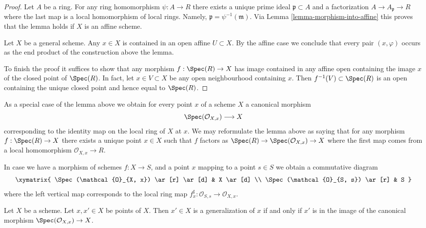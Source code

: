 \begin{proof}
Let $A$ be a ring. For any ring homomorphism $\psi : A \to R$
there exists a unique prime ideal $\mathfrak p \subset A$
and a factorization $A \to A_{\mathfrak p} \to R$ where the
last map is a local homomorphism of local rings. Namely,
$\mathfrak p = \psi^{-1}(\mathfrak m)$. Via
Lemma \ref{lemma-morphism-into-affine}
this proves that the lemma holds if $X$ is an affine scheme.

\medskip\noindent
Let $X$ be a general scheme. Any $x \in X$ is contained in
an open affine $U \subset X$. By the affine case we conclude that every pair
$(x, \varphi)$ occurs as the end product of the construction
above the lemma.

\medskip\noindent
To finish the proof it suffices to show that any morphism
$f : \Spec(R) \to X$ has image contained in any affine
open containing the image $x$ of the closed
point of $\Spec(R)$. In fact, let $x \in V \subset X$
be any open neighbourhood containing $x$. Then
$f^{-1}(V) \subset \Spec(R)$ is an open containing
the unique closed point and hence equal to $\Spec(R)$.
\end{proof}

\noindent
As a special case of the lemma above we obtain for every
point $x$ of a scheme $X$ a canonical morphism
\begin{equation}
\label{equation-canonical-morphism}
\Spec(\mathcal{O}_{X, x}) \longrightarrow X
\end{equation}
corresponding to the identity map on the local ring of $X$ at $x$.
We may reformulate the lemma above as saying that for any
morphism $f : \Spec(R) \to X$ there exists a unique point
$x \in X$ such that $f$ factors as
$\Spec(R) \to \Spec(\mathcal{O}_{X, x}) \to X$
where the first map comes from a local homomorphism
$\mathcal{O}_{X, x} \to R$.

\medskip\noindent
In case we have a morphism of schemes $f : X \to S$,
and a point $x$ mapping to a point $s \in S$ we obtain
a commutative diagram
$$
\xymatrix{
\Spec(\mathcal{O}_{X, x}) \ar[r] \ar[d] & X \ar[d] \\
\Spec(\mathcal{O}_{S, s}) \ar[r] & S
}
$$
where the left vertical map corresponds to the local ring map
$f^\sharp_x : \mathcal{O}_{S, s} \to \mathcal{O}_{X, x}$.

\begin{lemma}
\label{lemma-specialize-points}
Let $X$ be a scheme.
Let $x, x' \in X$ be points of $X$.
Then $x' \in X$ is a generalization of $x$ if and only if
$x'$ is in the image of the canonical morphism
$\Spec(\mathcal{O}_{X, x}) \to X$.
\end{lemma}

